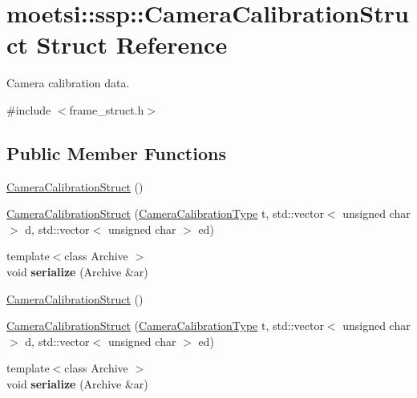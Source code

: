 \hypertarget{structmoetsi_1_1ssp_1_1CameraCalibrationStruct}{}\section{moetsi\+:\+:ssp\+:\+:Camera\+Calibration\+Struct Struct Reference}
\label{structmoetsi_1_1ssp_1_1CameraCalibrationStruct}


Camera calibration data.  




{\ttfamily \#include $<$frame\+\_\+struct.\+h$>$}

\subsection*{Public Member Functions}
\begin{DoxyCompactItemize}
\item 
\hyperlink{structmoetsi_1_1ssp_1_1CameraCalibrationStruct_a5571f80a7f6136c795fde444eef1d015}{Camera\+Calibration\+Struct} ()
\item 
\hyperlink{structmoetsi_1_1ssp_1_1CameraCalibrationStruct_afda542a87cb4e84eb1af89763f3d2c3c}{Camera\+Calibration\+Struct} (\hyperlink{namespacemoetsi_1_1ssp_a1f51291db51233dc5865d42e6ee36ef8}{Camera\+Calibration\+Type} t, std\+::vector$<$ unsigned char $>$ d, std\+::vector$<$ unsigned char $>$ ed)
\item 
\mbox{\label{structmoetsi_1_1ssp_1_1CameraCalibrationStruct_aec1417ffc77fb72c19a40e9b82b157b9}} 
{\footnotesize template$<$class Archive $>$ }\\void {\bfseries serialize} (Archive \&ar)
\item 
\hyperlink{structmoetsi_1_1ssp_1_1CameraCalibrationStruct_a5571f80a7f6136c795fde444eef1d015}{Camera\+Calibration\+Struct} ()
\item 
\hyperlink{structmoetsi_1_1ssp_1_1CameraCalibrationStruct_afda542a87cb4e84eb1af89763f3d2c3c}{Camera\+Calibration\+Struct} (\hyperlink{namespacemoetsi_1_1ssp_a1f51291db51233dc5865d42e6ee36ef8}{Camera\+Calibration\+Type} t, std\+::vector$<$ unsigned char $>$ d, std\+::vector$<$ unsigned char $>$ ed)
\item 
\mbox{\label{structmoetsi_1_1ssp_1_1CameraCalibrationStruct_aec1417ffc77fb72c19a40e9b82b157b9}} 
{\footnotesize template$<$class Archive $>$ }\\void {\bfseries serialize} (Archive \&ar)
\end{DoxyCompactItemize}
